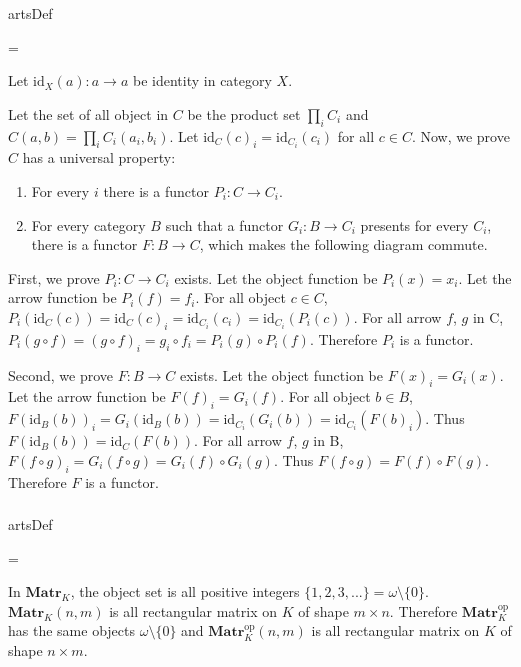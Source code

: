 \documentclass{article}
\newcounter{artCounter}
\newcounter{maxArts}
\newcommand{\showArt}{
\csname artsDef\roman{artCounter}\endcsname
\addtocounter{artCounter}{1}
\ifnum \value{artCounter}=\value{maxArts}
\setcounter{artCounter}{0}
\fi
}
\begin{document}
\showArt

Let $\mathrm{id}_X(a) : a \rightarrow a$ be identity in category $X$.

Let the set of all object in $C$ be the product set $\prod_i C_i$ and $C(a, b) = \prod_i C_i(a_i, b_i)$. Let $\mathrm{id}_C(c)_i = \mathrm{id}_{C_i}(c_i)$ for all $c \in C$. Now, we prove $C$ has a universal property:

\begin{enumerate}
\item For every $i$ there is a functor $P_i : C \rightarrow C_i$.
\item For every category $B$ such that a functor $G_i : B \rightarrow C_i$ presents for every $C_i$, there is a functor $F : B \rightarrow C$, which makes the following diagram commute.

\begin{center}
\end{center}
\end{enumerate}

First, we prove $P_i : C \rightarrow C_i$ exists. Let the object function be $P_i(x) = x_i$. Let the arrow function be $P_i(f) = f_i$. For all object $c \in C$, $P_i(\mathrm{id}_C(c)) = \mathrm{id}_C(c)_i = \mathrm{id}_{C_i}(c_i) = \mathrm{id}_{C_i}(P_i(c))$. For all arrow $f$, $g$ in C, $P_i(g \circ f) = (g \circ f)_i = g_i \circ f_i =  P_i(g) \circ P_i(f)$. Therefore $P_i$ is a functor.

Second, we prove $F : B \rightarrow C$ exists. Let the object function be $F(x)_i = G_i(x)$. Let the arrow function be $F(f)_i = G_i(f)$. For all object $b \in B$, $F(\mathrm{id}_B(b))_i = G_i(\mathrm{id}_B(b)) =  \mathrm{id}_{C_i}(G_i(b)) = \mathrm{id}_{C_i}(F(b)_i)$. Thus $F(\mathrm{id}_B(b)) = \mathrm{id}_{C}(F(b))$. For all arrow $f$, $g$ in B, $F(f \circ g)_i = G_i(f \circ g) = G_i(f) \circ G_i(g)$. Thus $F(f \circ g) = F(f) \circ F(g)$. Therefore $F$ is a functor.

\subsubsection{}



\showArt

In $\mathbf{Matr}_K$, the object set is all positive integers $\{1, 2, 3, ...\} = \omega \setminus \{0\}$. $\mathbf{Matr}_K(n, m)$ is all rectangular matrix on $K$ of shape $m \times n$. Therefore $\mathbf{Matr}_K^{\mathrm{op}}$ has the same objects $\omega \setminus \{0\}$ and  $\mathbf{Matr}_K^{\mathrm{op}}(n, m)$ is all rectangular matrix on $K$ of shape $n \times m$.
\end{document}
